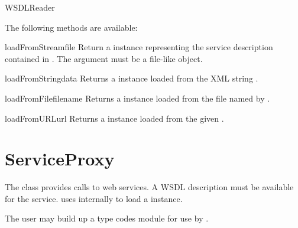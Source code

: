 \begin{classdesc}{WSDLReader}{}

The following methods are available:

\begin{methoddesc}{loadFromStream}{file}
Return a  instance representing the service description 
contained in . The  argument must be a file-like 
object.
\end{methoddesc}

\begin{methoddesc}{loadFromString}{data}
Returns a  instance loaded from the XML string .
\end{methoddesc}

\begin{methoddesc}{loadFromFile}{filename}
Returns a  instance loaded from the file named by .
\end{methoddesc}

\begin{methoddesc}{loadFromURL}{url}
Returns a  instance loaded from the given .
\end{methoddesc}

\end{classdesc}

\section{ServiceProxy}

The  class provides calls to
web services. A WSDL description must be available for the 
service.   uses  internally to load 
a  instance.

The user may build up a type codes module for use by .

